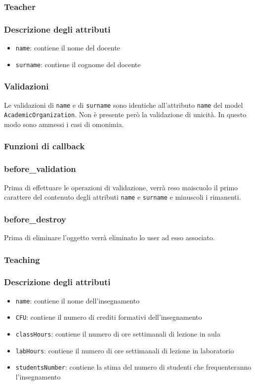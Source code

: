 \documentclass[11pt,a4paper]{article}
\begin{document}
\subsubsection{Teacher}
\subsubsection*{Descrizione degli attributi}
\begin{itemize}
 \item \verb|name|: contiene il nome del docente
 \item \verb|surname|: contiene il cognome del docente
\end{itemize}
\subsubsection*{Validazioni}
Le validazioni di \verb|name| e di \verb|surname| sono identiche all'attributo \verb|name| del model \verb|AcademicOrganization|. Non è presente però la validazione di unicità. In questo modo sono ammessi i casi di omonimia.
\subsubsection*{Funzioni di callback}
\subsubsection*{before\_validation}
Prima di effettuare le operazioni di validazione, verrà reso maiscuolo il primo carattere del contenuto degli attributi \verb|name| e \verb|surname| e minuscoli i rimanenti.
\subsubsection*{before\_destroy}
Prima di eliminare l'oggetto verrà eliminato lo user ad esso associato.
\subsubsection{Teaching}
\subsubsection*{Descrizione degli attributi}
\begin{itemize}
 \item \verb|name|: contiene il nome dell'insegnamento
 \item \verb|CFU|: contiene il numero di crediti formativi dell'insegnamento
 \item \verb|classHours|: contiene il numero di ore settimanali di lezione in aula
 \item \verb|labHours|: contiene il numero di ore settimanali di lezione in laboratorio
 \item \verb|studentsNumber|: contiene la stima del numero di studenti che frequenteranno l'insegnamento 
\end{itemize}
\end{document}
